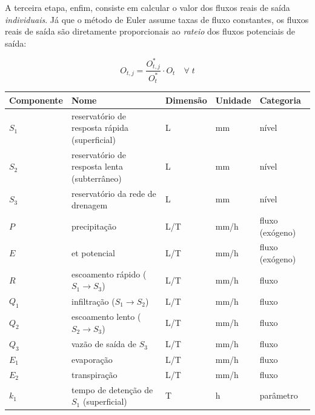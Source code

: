 \documentclass[./main.tex]{subfiles}
\begin{document}
A terceira etapa, enfim, consiste em calcular o valor dos fluxos reais de saída \textit{individuais}. Já que o método de Euler assume taxas de fluxo constantes, os fluxos reais de saída são diretamente proporcionais ao \textit{rateio} dos fluxos potenciais de saída:
\begin{linenomath*}
\begin{equation} 
	\label{eq:simult_3}
 O_{t, j} = \frac{O^*_{t, j}}{O^*_t} \cdot O_{t} \quad \forall\;t
\end{equation}
\end{linenomath*}

{\renewcommand{\arraystretch}{1.5}%
\begin{table}[t!]
    \centering	
    \tiny
    \sffamily
    \begin{tabular}{ 
        >{\raggedright\arraybackslash}m{1cm}  
        >{\raggedright\arraybackslash}m{5cm}  
        >{\raggedright\arraybackslash}m{1cm}
        >{\raggedright\arraybackslash}m{1cm}
        >{\raggedright\arraybackslash}m{2cm}}
        \toprule
        \textbf{Componente} & \textbf{Nome} & \textbf{Dimensão} & \textbf{Unidade} & \textbf{Categoria} \\ 
        \midrule
        $S_1$ & reservatório de resposta rápida (superficial) & L & mm & nível \\ 
        $S_2$ & reservatório de resposta lenta (subterrâneo) & L & mm & nível \\ 
        $S_3$ & reservatório da rede de drenagem & L & mm & nível \\ 
        $P$ & precipitação & L/T & mm/h & fluxo (exógeno)\\
        $E$ & \acrlong{et} potencial & L/T & mm/h & fluxo (exógeno)\\ 
        $R$ & escoamento rápido ($S_1 \rightarrow S_3$) & L/T & mm/h & fluxo\\ 
        $Q_1$ & infiltração ($S_1 \rightarrow S_2$) & L/T & mm/h & fluxo\\ 
        $Q_2$ & escoamento lento ($S_2 \rightarrow S_3$) & L/T & mm/h & fluxo\\ 
        $Q_3$ & vazão de saída de $S_3$ & L/T & mm/h & fluxo\\ 
        $E_1$ & evaporação & L/T & mm/h & fluxo\\ 
        $E_2$ & transpiração & L/T & mm/h & fluxo\\ 
        $k_1$ & tempo de detenção de $S_1$ (superficial) & T & h & parâmetro \\ 

\end{tabular}
\end{table}}
\end{document}
